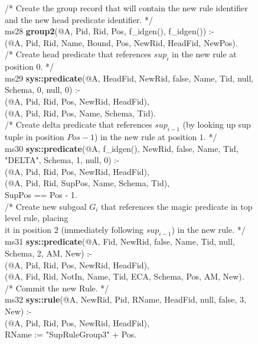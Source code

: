 \begin{appendix}
\begin{figure}[!t]
\ssp
\centering
\begin{boxedminipage}{\linewidth}
/* Create the group record that will contain the new rule identifier \\
and the new head predicate identifier. */ \\
ms28 {\bf group2}(@A, Pid, Rid, Pos, f\_idgen(), f\_idgen()) :- \\
(@A, Pid, Rid, Name, Bound, Pos, NewRid, HeadFid, NewPos). \\
	
/* Create head predicate that references $sup_i$ in the new rule at position $0$. */ \\
ms29 {\bf sys::predicate}(@A, HeadFid, NewRid, false, Name, Tid, null, Schema, 0, null, 0) :- \\
(@A, Pid, Rid, Pos, NewRid, HeadFid), \\
(@A, Pid, Rid, Pos, Name, Schema, Tid). \\
	
/* Create delta predicate that references  $sup_{i-1}$ (by looking up sup  \\
tuple in position $Pos - 1$) in the new rule at position $1$. */ \\
ms30 {\bf sys::predicate}(@A, f\_idgen(), NewRid, false, Name, Tid, "DELTA", Schema, 1, null, 0) :- \\
(@A, Pid, Rid, Pos, NewRid, HeadFid), \\
(@A, Pid, Rid, SupPos, Name, Schema, Tid), \\
\datalogspace SupPos == Pos - 1. \\
	
/* Create new subgoal $G_i$ that references the magic predicate in top level rule, placing \\
it in position $2$ (immediately following $sup_{i-1}$) in the new rule. */ \\
ms31 {\bf sys::predicate}(@A, Fid, NewRid, false, Name, Tid, null, Schema, 2, AM, New) :- \\
(@A, Pid, Rid, Pos, NewRid, HeadFid), \\
(@A, Fid, Rid, NotIn, Name, Tid, ECA, Schema, Pos, AM, New). \\
	
/* Commit the new Rule. */ \\
ms32 {\bf sys::rule}(@A, NewRid, Pid, RName, HeadFid, null, false, 3, New) :- \\
(@A, Pid, Rid, Pos, NewRid, HeadFid), \\
\datalogspace RName := "SupRuleGroup3" + Pos. \\


\end{boxedminipage}
\end{figure}
\end{appendix}
